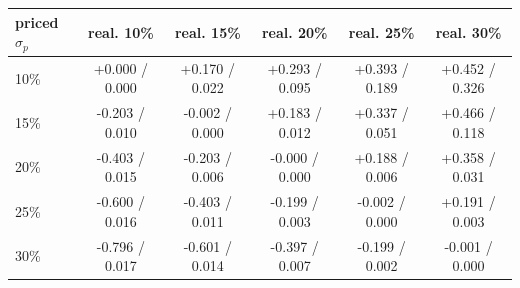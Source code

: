 \begin{tabular}{lccccc}
\toprule
priced $\sigma_p$ & real. 10\% & real. 15\% & real. 20\% & real. 25\% & real. 30\% \\
\midrule
10\% & +0.000 / 0.000 & +0.170 / 0.022 & +0.293 / 0.095 & +0.393 / 0.189 & +0.452 / 0.326 \\
15\% & -0.203 / 0.010 & -0.002 / 0.000 & +0.183 / 0.012 & +0.337 / 0.051 & +0.466 / 0.118 \\
20\% & -0.403 / 0.015 & -0.203 / 0.006 & -0.000 / 0.000 & +0.188 / 0.006 & +0.358 / 0.031 \\
25\% & -0.600 / 0.016 & -0.403 / 0.011 & -0.199 / 0.003 & -0.002 / 0.000 & +0.191 / 0.003 \\
30\% & -0.796 / 0.017 & -0.601 / 0.014 & -0.397 / 0.007 & -0.199 / 0.002 & -0.001 / 0.000 \\
\bottomrule
\end{tabular}
